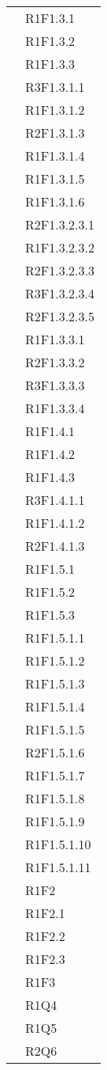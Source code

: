 \begin{longtable}{|>{\centering}m{5cm}|m{5cm}<{\centering}|}
&{R1F1.3.1}\\
&{R1F1.3.2}\\
&{R1F1.3.3}\\
&{R3F1.3.1.1}\\
&{R1F1.3.1.2}\\
&{R2F1.3.1.3}\\
&{R1F1.3.1.4}\\
&{R1F1.3.1.5}\\
&{R1F1.3.1.6}\\
&{R2F1.3.2.3.1}\\
&{R1F1.3.2.3.2}\\
&{R2F1.3.2.3.3}\\
&{R3F1.3.2.3.4}\\
&{R2F1.3.2.3.5}\\
&{R1F1.3.3.1}\\
&{R2F1.3.3.2}\\
&{R3F1.3.3.3}\\
&{R1F1.3.3.4}\\

&{R1F1.4.1}\\
&{R1F1.4.2}\\
&{R1F1.4.3}\\
&{R3F1.4.1.1}\\
&{R1F1.4.1.2}\\
&{R2F1.4.1.3}\\

&{R1F1.5.1}\\
&{R1F1.5.2}\\
&{R1F1.5.3}\\
&{R1F1.5.1.1}\\
&{R1F1.5.1.2}\\
&{R1F1.5.1.3}\\
&{R1F1.5.1.4}\\
&{R1F1.5.1.5}\\
&{R2F1.5.1.6}\\
&{R1F1.5.1.7}\\
&{R1F1.5.1.8}\\
&{R1F1.5.1.9}\\
&{R1F1.5.1.10}\\
&{R1F1.5.1.11}\\

&{R1F2}\\
&{R1F2.1}\\
&{R1F2.2}\\
&{R1F2.3}\\

&{R1F3}\\

&{R1Q4}\\
&{R1Q5}\\
&{R2Q6}\\ 


\end{longtable}
